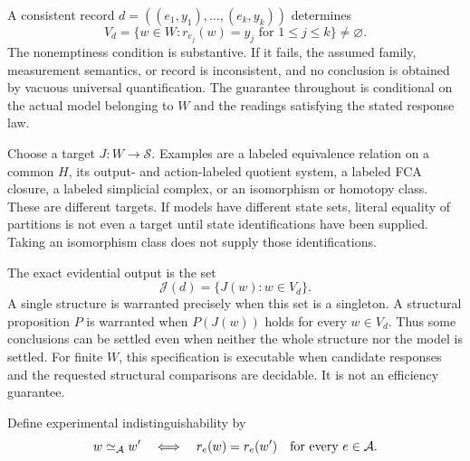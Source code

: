 \documentclass[11pt]{article}
\theoremstyle{definition}
\begin{document}
A consistent record $d=((e_1,y_1),\ldots,(e_k,y_k))$ determines
\[
 V_d=\{w\in W:r_{e_j}(w)=y_j\text{ for }1\le j\le k\}\ne\varnothing.
\]
The nonemptiness condition is substantive. If it fails, the assumed family,
measurement semantics, or record is inconsistent, and no conclusion is
obtained by vacuous universal quantification. The guarantee throughout is
conditional on the actual model belonging to $W$ and the readings satisfying
the stated response law.

Choose a target $J:W\to\mathcal S$. Examples are a labeled equivalence
relation on a common $H$, its output- and action-labeled quotient system,
a labeled FCA closure, a labeled simplicial complex, or an isomorphism or
homotopy class. These are different targets. If models have different state
sets, literal equality of partitions is not even a target until state
identifications have been supplied. Taking an isomorphism class does not
supply those identifications.

The exact evidential output is the set
\[
 \mathcal J(d)=\{J(w):w\in V_d\}.
\]
A single structure is warranted precisely when this set is a singleton.
A structural proposition $P$ is warranted when $P(J(w))$ holds for every
$w\in V_d$. Thus some conclusions can be settled even when neither the
whole structure nor the model is settled. For finite $W$, this specification
is executable when candidate responses and the requested structural
comparisons are decidable. It is not an efficiency guarantee.

Define experimental indistinguishability by
\[
 w\simeq_{\mathcal A}w'
 \quad\Longleftrightarrow\quad
 r_e(w)=r_e(w')\quad\hbox{for every }e\in\mathcal A.
\]
\end{document}
